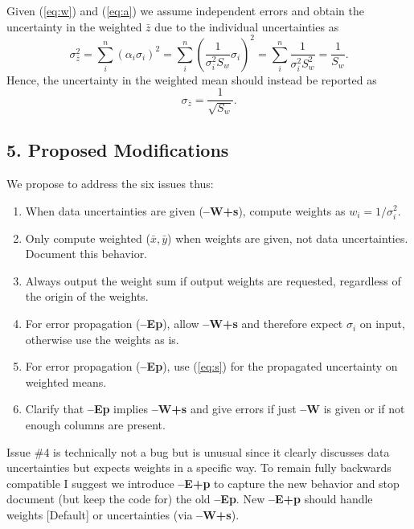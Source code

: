 \documentclass[12pt,letterpaper,margin=0.5in]{report}
\begin{document}
Given (\ref{eq:w}) and (\ref{eq:a}) we assume independent errors and obtain the uncertainty in the weighted $\bar{z}$ due to the individual uncertainties as
\begin{equation}
	\sigma_{\bar{z}}^2 = \sum_i^n \left (\alpha_i \sigma_i \right )^2 = \sum_i^n \left (\frac{1}{\sigma_i^2 S_w} \sigma_i \right )^2 = \sum_i^n \frac{1}{\sigma_i^2 S_w^2} = \frac{1}{S_w}.
	\label{eq:v}
\end{equation}
Hence, the uncertainty in the weighted mean should instead be reported as
\begin{equation}
	\sigma_{\bar{z}} = \frac{1}{\sqrt{S_w}}.
	\label{eq:s}
\end{equation}

\subsection*{5. Proposed Modifications}

We propose to address the six issues thus:
\begin{enumerate}
	\item When data uncertainties are given ({\bf --W+s}), compute weights as $w_i = 1/\sigma_i^2$.
	\item Only compute weighted ($\bar{x}, \bar{y}$) when weights are given, not data uncertainties. Document this behavior.
	\item Always output the weight sum if output weights are requested, regardless of the origin of the weights.
	\item For error propagation ({\bf --Ep}), allow {\bf --W+s} and therefore expect $\sigma_i$ on input, otherwise use the weights as is.
	\item For error propagation ({\bf --Ep}), use (\ref{eq:s}) for the propagated uncertainty on weighted means.
	\item Clarify that {\bf --Ep} implies {\bf --W+s} and give errors if just {\bf --W} is given or if not enough columns are present.
\end{enumerate}
Issue \#4 is technically not a bug but is unusual since it clearly discusses data uncertainties but expects weights in a specific way.  To remain fully backwards
compatible I suggest we introduce  {\bf --E+p} to capture the new behavior and stop document (but keep the code for) the old {\bf --Ep}. New {\bf --E+p} should handle weights [Default] or uncertainties (via {\bf --W+s}).
\end{document}
